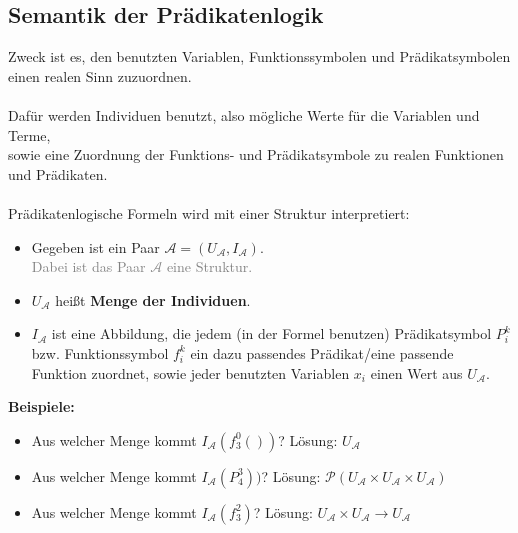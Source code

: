 \documentclass{article}
\begin{document}
	\subsection{Semantik der Prädikatenlogik}
	Zweck ist es, den benutzten Variablen, Funktionssymbolen und Prädikatsymbolen einen realen Sinn zuzuordnen. \\
	\\
	Dafür werden Individuen benutzt, also mögliche Werte für die Variablen und Terme,\\
	sowie eine Zuordnung der Funktions- und Prädikatsymbole zu realen Funktionen und Prädikaten.\\
	\\
	Prädikatenlogische Formeln wird mit einer Struktur interpretiert:
	\begin{itemize}
		\item Gegeben ist ein Paar $\mathcal{A} = (U_\mathcal{A}, I_\mathcal{A})$. \\
		\textcolor{gray}{Dabei ist das Paar $\mathcal{A}$ eine Struktur.}
		\item $U_\mathcal{A}$ heißt \textbf{Menge der Individuen}.
		\item $I_\mathcal{A}$ ist eine Abbildung, die jedem (in der Formel benutzen) Prädikatsymbol $P^k_i$ bzw. Funktionssymbol $f^k_i$ ein dazu passendes Prädikat/eine passende Funktion zuordnet, sowie jeder benutzten Variablen $x_i$ einen Wert aus $U_\mathcal{A}$.
	\end{itemize} 
	\textbf{Beispiele: }
	\begin{itemize}
		\item Aus welcher Menge kommt $I_\mathcal{A}(f^0_3())$? Lösung: $U_\mathcal{A}$ 
		\item Aus welcher Menge kommt $I_\mathcal{A}(P^3_4))$? Lösung: $\mathcal{P}(U_\mathcal{A} \times U_\mathcal{A} \times U_\mathcal{A})$
		\item Aus welcher Menge kommt $I_\mathcal{A}(f^2_3)$? Lösung: $U_\mathcal{A} \times U_\mathcal{A} \rightarrow U_\mathcal{A}$
	\end{itemize}
\end{document}
